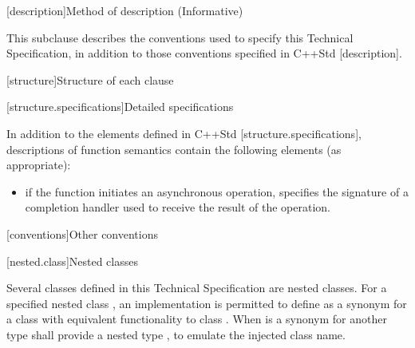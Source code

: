 
[description]{Method of description (Informative)}

\pnum
 This subclause describes the conventions used to specify this Technical Specification, in addition to those conventions specified in C++Std [description].


[structure]{Structure of each clause}


[structure.specifications]{Detailed specifications}

\pnum
In addition to the elements defined in C++Std [structure.specifications], descriptions of function semantics contain the following elements (as appropriate):

\begin{itemize}
\item
\completionsig if the function initiates an asynchronous operation, specifies the signature of a completion handler used to receive the result of the operation.
\end{itemize}




[conventions]{Other conventions}


[nested.class]{Nested classes}

\pnum
Several classes defined in this Technical Specification are nested classes. For a specified nested class , an implementation is permitted to define  as a synonym for a class with equivalent functionality to class . \enternote When  is a synonym for another type  shall provide a nested type , to emulate the injected class name. \exitnote




